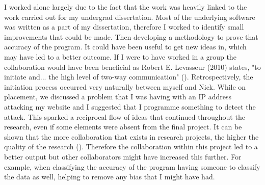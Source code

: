 I worked alone largely due to the fact that the work was heavily linked to the work carried out for my undergrad dissertation. Most of the underlying software was written as a part of my dissertation, therefore I worked to identify small improvements that could be made. Then developing a methodology to prove that accuracy of the program. It could have been useful to get new ideas in, which may have led to a better outcome. If I were to have worked in a group the collaboration would have been beneficial as Robert E. Levasseur (2010) states, "to initiate and... the high level of two-way communication" (\cite{levasseur2010people}). Retrospectively, the initiation process occurred very naturally between myself and Nick. While on placement, we discussed a problem that I was having with an IP address attacking my website and I suggested that I programme something to detect the attack. This sparked a reciprocal flow of ideas that continued throughout the research, even if some elements were absent from the final project. It can be shown that the more collaboration that exists in research projects, the higher the quality of the research (\cite{figg2006scientific}). Therefore the collaboration within this project led to a better output but other collaborators might have increased this further. For example, when classifying the accuracy of the program having someone to classify the data as well, helping to remove any bias that I might have had.




